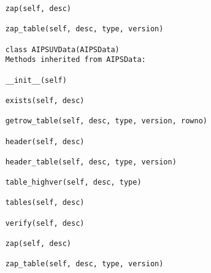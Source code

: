 \documentclass[11pt]{report}
\begin{document}
\begin{verbatim}
    zap(self, desc)
    
    zap_table(self, desc, type, version)
    
    class AIPSUVData(AIPSData)
    Methods inherited from AIPSData:
    
    __init__(self)
    
    exists(self, desc)
    
    getrow_table(self, desc, type, version, rowno)
    
    header(self, desc)
    
    header_table(self, desc, type, version)
    
    table_highver(self, desc, type)
    
    tables(self, desc)
    
    verify(self, desc)
    
    zap(self, desc)
    
    zap_table(self, desc, type, version)

\end{verbatim}
\end{document}
